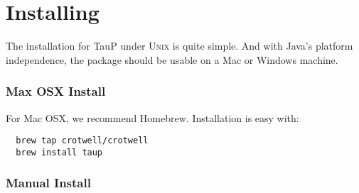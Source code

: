 
\section{Installing}
\label{install}

The installation for TauP under \textsc{Unix} is quite simple. And with Java's
platform independence, the package should be usable on a Mac or Windows
machine.

\subsubsection{Max OSX Install}

For Mac OSX, we recommend Homebrew. Installation is easy with:

\begin{verbatim}
  brew tap crotwell/crotwell
  brew install taup
\end{verbatim}

\subsubsection{Manual Install}

